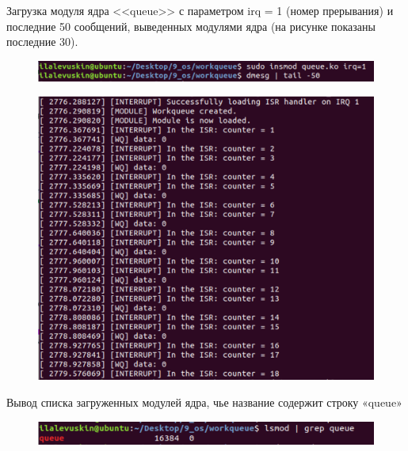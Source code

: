 \documentclass[a4paper,12pt]{article}
\begin{document}
	Загрузка модуля ядра <<queue>> с параметром irq = 1 (номер прерывания) и последние 50 сообщений, выведенных модулями ядра (на рисунке показаны последние 30).
	
	\begin{figure}[h!]
		\begin{center}
			{\includegraphics[scale = 0.7]{5.png}}
			\label{5}
		\end{center}
	\end{figure}
	
	\begin{figure}[h!]
		\begin{center}
			{\includegraphics[scale = 0.7]{6.png}}
			\label{6}
		\end{center}
	\end{figure}

	\newpage

	Вывод списка загруженных модулей ядра, чье название содержит строку «queue»
	
	\begin{figure}[h!]
		\begin{center}
			{\includegraphics[scale = 0.7]{6.5.png}}
			\label{6.5}
		\end{center}
	\end{figure}
	
\end{document}
